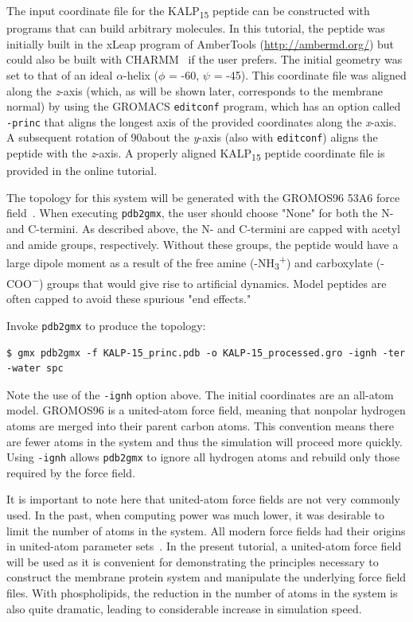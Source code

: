 \documentclass[9pt,tutorial,pubversion]{livecoms}
\begin{document}
The input coordinate file for the KALP\textsubscript{15} peptide can be constructed with programs that can build arbitrary molecules. In this tutorial, the peptide was initially built in the xLeap program of AmberTools (\url{http://ambermd.org/}) but could also be built with CHARMM~\cite{Brooks2009} if the user prefers. The initial geometry was set to that of an ideal $\alpha$-helix ($\phi$ = -60\textdegree, $\psi$ = -45\textdegree). This coordinate file was aligned along the {\em z}-axis (which, as will be shown later, corresponds to the membrane normal) by using the GROMACS \texttt{editconf} program, which has an option called \texttt{-princ} that aligns the longest axis of the provided coordinates along the {\em x}-axis. A subsequent rotation of 90\textdegree about the {\em y}-axis (also with \texttt{editconf}) aligns the peptide with the {\em z}-axis. A properly aligned KALP\textsubscript{15} peptide coordinate file is provided in the online tutorial.

The topology for this system will be generated with the GROMOS96 53A6 force field~\cite{Oostenbrink2004}. When executing \texttt{pdb2gmx}, the user should choose "None" for both the N- and C-termini. As described above, the N- and C-termini are capped with acetyl and amide groups, respectively. Without these groups, the peptide would have a large dipole moment as a result of the free amine (-NH\textsubscript{3}\textsuperscript{+}) and carboxylate (-COO\textsuperscript{$-$}) groups that would give rise to artificial dynamics. Model peptides are often capped to avoid these spurious "end effects."

Invoke \texttt{pdb2gmx} to produce the topology:

\begin{lstlisting}
$ gmx pdb2gmx -f KALP-15_princ.pdb -o KALP-15_processed.gro -ignh -ter -water spc
\end{lstlisting}
%
Note the use of the \texttt{-ignh} option above. The initial coordinates are an all-atom model. GROMOS96 is a united-atom force field, meaning that nonpolar hydrogen atoms are merged into their parent carbon atoms. This convention means there are fewer atoms in the system and thus the simulation will proceed more quickly. Using \texttt{-ignh} allows \texttt{pdb2gmx} to ignore all hydrogen atoms and rebuild only those required by the force field.

It is important to note here that united-atom force fields are not very commonly used. In the past, when computing power was much lower, it was desirable to limit the number of atoms in the system. All modern force fields had their origins in united-atom parameter sets~\cite{Gelin1979,Weiner1984,Jorgensen1984}. In the present tutorial, a united-atom force field will be used as it is convenient for demonstrating the principles necessary to construct the membrane protein system and manipulate the underlying force field files. With phospholipids, the reduction in the number of atoms in the system is also quite dramatic, leading to considerable increase in simulation speed.
\end{document}
